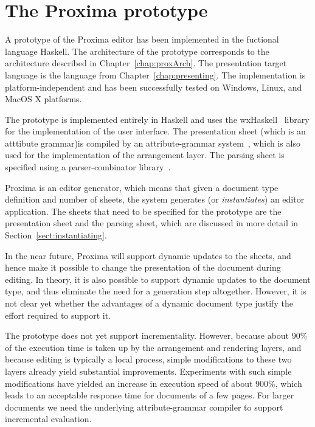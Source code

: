 \chapter{The Proxima prototype} \label{chap:prototype}


\newcommand{\epsfigPrx}[3]{\epsfig{file=pics/Screenshots/#1, height=#3mm}}


A prototype of the Proxima editor has been implemented in the fuctional language Haskell. The architecture of the prototype corresponds to the architecture described in Chapter~\ref{chap:proxArch}. The presentation target language is the {\Xprez} language from Chapter~\ref{chap:presenting}. The implementation is platform-independent and has been successfully tested on Windows, Linux, and MacOS X platforms. 

The prototype is implemented entirely in Haskell and uses the wxHaskell~\cite{leijen04wxHaskell} library for the implementation of the user interface. The presentation sheet \bc (which is an atttibute grammar)\ec  is compiled by an  attribute-grammar system~\cite{swierstra04ag}, which is also used for the implementation of the arrangement layer. The parsing sheet is specified using a parser-combinator library~\cite{swierstra01parsers}.


Proxima is an editor generator, which means that given a document type definition and number of sheets, the system generates (or {\em instantiates}) an editor application. The sheets that need to be specified for the prototype are the presentation sheet and the parsing sheet, which are discussed in more detail in Section~\ref{sect:instantiating}.

In the near future, Proxima will support dynamic updates to the sheets, and hence make it possible to change the presentation of the document during editing. In theory, it is also possible to support dynamic updates to the document type, and thus eliminate the need for a generation step altogether. However, it is not clear yet whether the advantages of a dynamic document type justify the effort required to support it. 


The prototype does not yet support incrementality. However, because about 90\% 
of the execution time is taken up by the arrangement and rendering layers, and because editing is typically a local process, simple modifications to these two layers already yield substantial improvements. Experiments with such simple modifications have yielded an increase in execution speed of about 900\%,
which leads to an acceptable response time for documents of a few pages. For larger documents we need the underlying attribute-grammar compiler to support incremental evaluation.

